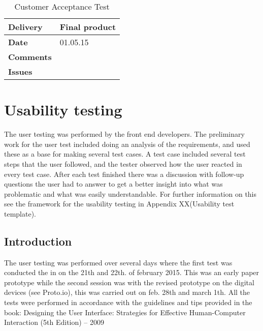 \begin{center}
\begin{longtable}{ | p{4cm} | p{13cm} | }
					
					
				\end{longtable}
			\end{center}
			
			\renewcommand{\arraystretch}{2}%
			\begin{center}
				\begin{longtable}{ | p{4cm} | p{13cm} | }
					
					\caption[Customer Acceptance test]{Customer Acceptance Test } \label{Tab:cattest5}\\
					\hline
					\textbf{Delivery} & Final product\\ \hline
					\textbf{Date} & 01.05.15 \\ \hline
					\textbf{Comments} &   \\ \hline
					\textbf{Issues} \\ \hline
				\end{longtable}
			\end{center}
			
			\section{Usability testing}
			
			The user testing was performed by the front end developers. The preliminary work for the user test included doing an analysis of the requirements, and used these as a base for making several test cases. 
			A test case included several test steps that the user followed, and the tester observed how the user reacted in every test case. After each test finished there was a discussion with follow-up questions the user had to answer to get a better insight into what was problematic and what was easily understandable. For further information on this see the framework for the usability testing in Appendix XX(Usability test template).
			
			\subsection{Introduction}
			The user testing was performed over several days where the first test was conducted the in on the 21th and 22th. of february 2015. This was an early paper prototype while the second session was with the revised prototype on the digital devices (see Proto.io), this was carried out on feb. 28th and march 1th. All the tests were performed in accordance with the guidelines and tips provided in the book: Designing the User Interface: Strategies for Effective Human-Computer Interaction (5th Edition) – 2009
			
